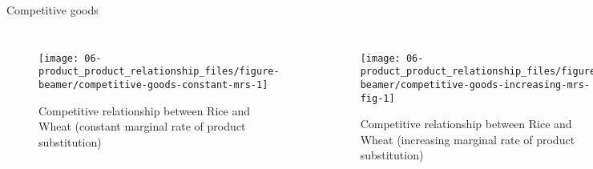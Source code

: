 \documentclass[12pt,ignorenonframetext,aspectratio=169]{beamer}
\begin{document}
\begin{frame}{Competitive goods}
\protect\hypertarget{competitive-goods}{}
\begin{columns}
    \centering

\begin{figure}

{\centering \texttt{[image: 06-product\_product\_relationship\_files/figure-beamer/competitive-goods-constant-mrs-1]} 

}

\caption{Competitive relationship between Rice and Wheat (constant marginal rate of product substitution)}\label{fig:competitive-goods-constant-mrs}
\end{figure}

      \footnotesize

\begin{figure}

{\centering \texttt{[image: 06-product\_product\_relationship\_files/figure-beamer/competitive-goods-increasing-mrs-fig-1]} 

}

\caption{Competitive relationship between Rice and Wheat (increasing marginal rate of product substitution)}\label{fig:competitive-goods-increasing-mrs-fig}
\end{figure}

\begin{table}[H]
\centering\begingroup\fontsize{5}{7}\selectfont

\endgroup{}
\end{table}



\end{columns}
\end{frame}
\end{document}
